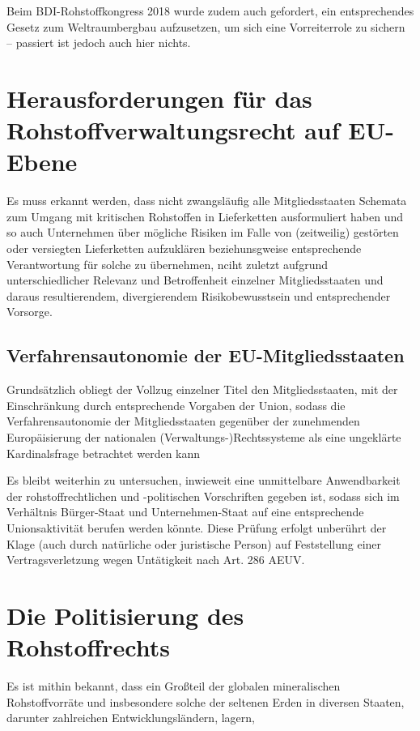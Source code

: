 \documentclass[12pt,a4paper,oneside]{book} %
\begin{document}
Beim BDI-Rohstoffkongress 2018 wurde zudem auch gefordert, ein entsprechendes Gesetz zum Weltraumbergbau aufzusetzen, um sich eine Vorreiterrole zu sichern -- passiert ist jedoch auch hier nichts.



\section{Herausforderungen für das Rohstoffverwaltungsrecht auf EU-Ebene}
Es muss erkannt werden, dass nicht zwangsläufig alle Mitgliedsstaaten Schemata zum Umgang mit kritischen Rohstoffen in Lieferketten ausformuliert haben und so auch Unternehmen über mögliche Risiken im Falle von (zeitweilig) gestörten oder versiegten Lieferketten aufzuklären beziehunsgweise entsprechende Verantwortung für solche zu übernehmen, nciht zuletzt aufgrund unterschiedlicher Relevanz und Betroffenheit einzelner Mitgliedsstaaten und daraus resultierendem, divergierendem Risikobewusstsein und entsprechender Vorsorge.

\subsection{Verfahrensautonomie der EU-Mitgliedsstaaten}
Grundsätzlich obliegt der Vollzug einzelner Titel den Mitgliedsstaaten, mit der Einschränkung durch entsprechende Vorgaben der Union, sodass die Verfahrensautonomie der Mitgliedsstaaten gegenüber der zunehmenden Europäisierung der nationalen (Verwaltungs-)Rechtssysteme als eine \glqq ungeklärte Kardinalsfrage\grqq \autocite{Ludiwgs, NVwZ 2018, 1417} betrachtet werden kann

Es bleibt weiterhin zu untersuchen, inwieweit eine unmittelbare Anwendbarkeit der rohstoffrechtlichen und -politischen Vorschriften gegeben ist, sodass sich im Verhältnis Bürger-Staat und Unternehmen-Staat auf eine entsprechende Unionsaktivität berufen werden könnte. Diese Prüfung erfolgt unberührt der Klage (auch durch natürliche oder juristische Person) auf Feststellung einer Vertragsverletzung wegen Untätigkeit nach Art. 286 AEUV.

\section{Die Politisierung des Rohstoffrechts}

Es ist mithin bekannt, dass ein Großteil der globalen mineralischen Rohstoffvorräte und insbesondere solche der seltenen Erden in diversen Staaten, darunter zahlreichen Entwicklungsländern, lagern, 
\end{document}
